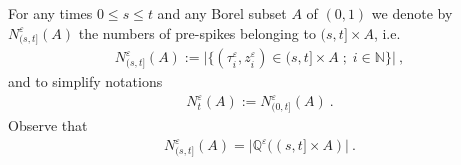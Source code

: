 \documentclass[reqno, 12pt, a4paper]{amsart}
\theoremstyle{plain}
\newtheorem{lemma}[theorem]{Lemma}
\theoremstyle{definition}
\begin{document}
%
%




%





For any times $0 \le s \le t$ and any Borel subset $A$ of $(0,1)$ we denote by $N^{\varepsilon}_{(s,t]} (A)$ the numbers of pre-spikes belonging to $(s,t]\times A$, i.e.
\begin{equation}
\label{eq:NstA}
\begin{split}
N_{(s,t]}^{\varepsilon} (A) := \Big\vert \big\{ (\tau_i^{\varepsilon}, z_i^\varepsilon)  \in (s,t] \times A \; ; \; i \in \mathbb N  \big\} \Big\vert \ ,
\end{split}
\end{equation}
 and to simplify notations
 \begin{equation}
\begin{split}
N^{\varepsilon}_t (A):= N_{(0,t]}^\varepsilon (A) \ .
\end{split}
\end{equation}
Observe that 
\begin{equation}
\label{eq:NQ}
\begin{split}
N_{(s,t]}^{\varepsilon} (A)  = \big\vert \mathbb Q^\varepsilon ((s,t] \times A) \big\vert \ .
\end{split}
\end{equation}
\end{document}
